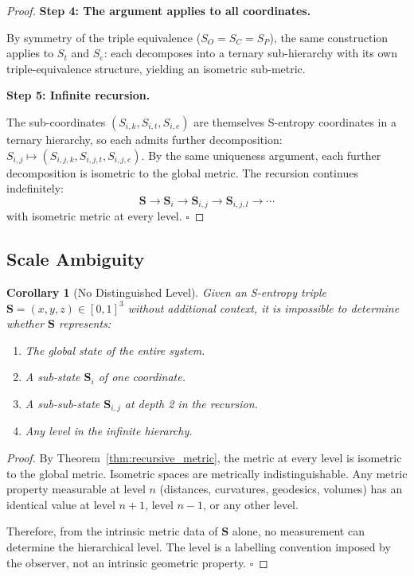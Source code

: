 \documentclass[12pt,twocolumn]{article}
\newtheorem{corollary}[theorem]{Corollary}
\begin{document}
\begin{proof}
\textbf{Step 4: The argument applies to all coordinates.}

By symmetry of the triple equivalence ($S_O = S_C = S_P$), the same construction applies to $S_t$ and $S_e$: each decomposes into a ternary sub-hierarchy with its own triple-equivalence structure, yielding an isometric sub-metric.

\textbf{Step 5: Infinite recursion.}

The sub-coordinates $(S_{i,k}, S_{i,t}, S_{i,e})$ are themselves S-entropy coordinates in a ternary hierarchy, so each admits further decomposition: $S_{i,j} \mapsto (S_{i,j,k}, S_{i,j,t}, S_{i,j,e})$. By the same uniqueness argument, each further decomposition is isometric to the global metric. The recursion continues indefinitely:
\begin{equation}
\mathbf{S} \to \mathbf{S}_i \to \mathbf{S}_{i,j} \to \mathbf{S}_{i,j,l} \to \cdots
\end{equation}
with isometric metric at every level. $\square$
\end{proof}

\subsection{Scale Ambiguity}

\begin{corollary}[No Distinguished Level]
\label{cor:no_top}
Given an S-entropy triple $\mathbf{S} = (x, y, z) \in [0,1]^3$ without additional context, it is impossible to determine whether $\mathbf{S}$ represents:
\begin{enumerate}
\item The global state of the entire system.
\item A sub-state $\mathbf{S}_i$ of one coordinate.
\item A sub-sub-state $\mathbf{S}_{i,j}$ at depth 2 in the recursion.
\item Any level in the infinite hierarchy.
\end{enumerate}
\end{corollary}

\begin{proof}
By Theorem~\ref{thm:recursive_metric}, the metric at every level is isometric to the global metric. Isometric spaces are metrically indistinguishable. Any metric property measurable at level $n$ (distances, curvatures, geodesics, volumes) has an identical value at level $n+1$, level $n-1$, or any other level.

Therefore, from the intrinsic metric data of $\mathbf{S}$ alone, no measurement can determine the hierarchical level. The level is a labelling convention imposed by the observer, not an intrinsic geometric property. $\square$
\end{proof}
\end{document}
